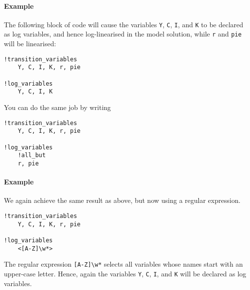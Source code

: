 \paragraph{Example}

The following block of code will cause the variables \texttt{Y},
\texttt{C}, \texttt{I}, and \texttt{K} to be declared as log variables,
and hence log-linearised in the model solution, while \texttt{r} and
\texttt{pie} will be linearised:

\begin{verbatim}
!transition_variables
    Y, C, I, K, r, pie

!log_variables
    Y, C, I, K
\end{verbatim}

You can do the same job by writing

\begin{verbatim}
!transition_variables
    Y, C, I, K, r, pie

!log_variables
    !all_but
    r, pie
\end{verbatim}

\paragraph{Example}

We again achieve the same result as above, but now using a regular
expression.

\begin{verbatim}
!transition_variables
    Y, C, I, K, r, pie

!log_variables
    <[A-Z]\w*>
\end{verbatim}

The regular expression \texttt{{[}A-Z{]}\textbackslash{}w*} selects all
variables whose names start with an upper-case letter. Hence, again the
variables \texttt{Y}, \texttt{C}, \texttt{I}, and \texttt{K} will be
declared as log variables.


